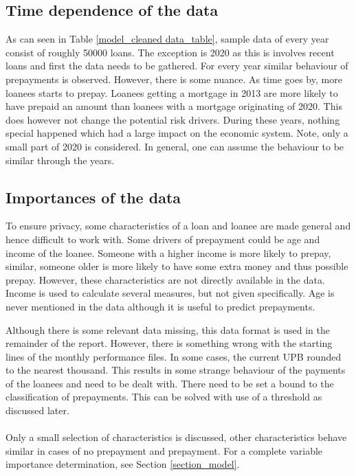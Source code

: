 \subsection{Time dependence of the data}
    As can seen in Table \ref{model_cleaned data_table}, sample data of every year consist of roughly 50000 loans. The exception is 2020 as this is involves recent loans and first the data needs to be gathered. For every year similar behaviour of prepayments is observed. However, there is some nuance. As time goes by, more loanees starts to prepay. Loanees getting a mortgage in 2013 are more likely to have prepaid an amount than loanees with a mortgage originating of 2020. This does however not change the potential risk drivers. During these years, nothing special happened which had a large impact on the economic system. Note, only a small part of 2020 is considered. In general, one can assume the behaviour to be similar through the years.

\subsection{Importances of the data}
    To ensure privacy, some characteristics of a loan and loanee are made general and hence difficult to work with. Some drivers of prepayment could be age and income of the loanee. Someone with a higher income is more likely to prepay, similar, someone older is more likely to have some extra money and thus possible prepay. However, these characteristics are not directly available in the data. Income is used to calculate several measures, but not given specifically. Age is never mentioned in the data although it is useful to predict prepayments.  

    Although there is some relevant data missing, this data format is used in the remainder of the report.  However, there is something wrong with the starting lines of the monthly performance files. In some cases, the current UPB rounded to the nearest thousand. This results in some strange behaviour of the payments of the loanees and need to be dealt with. There need to be set a bound to the classification of prepayments. This can be solved with use of a threshold as discussed later. 
    \\\\
    Only a small selection of characteristics is discussed, other characteristics behave similar in cases of no prepayment and prepayment. For a complete variable importance determination, see Section \ref{section_model}. 
    
